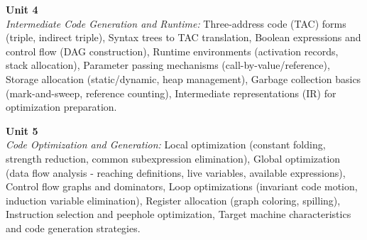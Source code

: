 \vspace{0.3cm}

\noindent\textbf{Unit 4} \\
\textit{Intermediate Code Generation and Runtime:} Three-address code (TAC) forms (triple, indirect triple), Syntax trees to TAC translation, Boolean expressions and control flow (DAG construction), Runtime environments (activation records, stack allocation), Parameter passing mechanisms (call-by-value/reference), Storage allocation (static/dynamic, heap management), Garbage collection basics (mark-and-sweep, reference counting), Intermediate representations (IR) for optimization preparation.

\vspace{0.3cm}

\noindent\textbf{Unit 5} \\
\textit{Code Optimization and Generation:} Local optimization (constant folding, strength reduction, common subexpression elimination), Global optimization (data flow analysis - reaching definitions, live variables, available expressions), Control flow graphs and dominators, Loop optimizations (invariant code motion, induction variable elimination), Register allocation (graph coloring, spilling), Instruction selection and peephole optimization, Target machine characteristics and code generation strategies.

\newpage
{}

